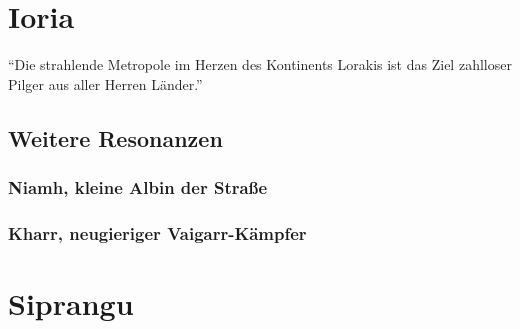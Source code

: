 \documentclass[a4paper]{scrreprt}
\begin{document}
\chapter[17. Dezember 2016]{Ioria}
\begin{center}
	\enquote{Die strahlende Metropole im Herzen des Kontinents Lorakis ist das Ziel zahlloser Pilger aus aller Herren Länder.}
\end{center}

\section{Weitere Resonanzen}
\subsection{Niamh, kleine Albin der Straße}
\subsection{Kharr, neugieriger Vaigarr-Kämpfer}

\chapter[14. Januar 2017]{Siprangu}
\end{document}
